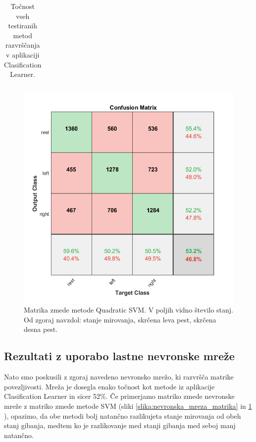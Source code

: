 \begin{table}
\begin{tabular}{|l|l|c|}
\hline
\end{tabular}
\caption{Točnost vseh testiranih metod razvrščanja v aplikaciji Clasification Learner.}
\label{tabela:primerjava_tocnosti}
\end{table}

\begin{figure}
    \begin{center}
    \includegraphics[width=0.8\linewidth]{slike/ConfusionSVM.png}
    \end{center}
    \caption[Matrika zmede metode Quadratic SVM.]{Matrika zmede metode Quadratic SVM. V poljih vidno število stanj. Od zgoraj navzdol: stanje mirovanja, skrčena leva pest, skrčena desna pest.}
    \label{slika:SVM_matrika}
    \end{figure}

\subsection{Rezultati z uporabo lastne nevronske mreže}
Nato smo poskusili z zgoraj navedeno nevronsko mrežo, ki razvršča matrike povezljivosti. Mreža je dosegla enako točnost kot metode iz aplikacije Clasification Learner in sicer 52\%. Če primerjamo matriko zmede nevronske mreže z matriko zmede metode SVM (sliki \ref{slika:nevronska_mreza_matrika} in \ref{slika:SVM_matrika} ), opazimo, da obe metodi bolj natančno razlikujeta stanje mirovanja od obeh stanj gibanja, medtem ko je razlikovanje med stanji gibanja med seboj manj natančno.

